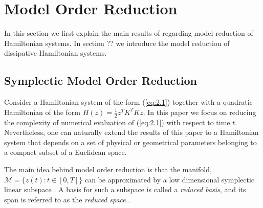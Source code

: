 \section{Model Order Reduction} \label{sec:3}
In this section we first explain the main results of \cite{Peng:2014di} regarding model reduction of Hamiltonian systems. In section ?? we introduce the model reduction of dissipative Hamiltonian systems.

\subsection{Symplectic Model Order Reduction}
Consider a Hamiltonian system of the form (\ref{eq:2.1}) together with a quadratic Hamiltonian of the form $H(z) = \frac 1 2 z^T K^T K z$. In this paper we focus on reducing the complexity of numerical evaluation of (\ref{eq:2.1}) with respect to time $t$. Nevertheless, one can naturally extend the results of this paper to a Hamiltonian system that depends on a set of physical or geometrical parameters belonging to a compact subset of a Euclidean space.

The main idea behind model order reduction is that the manifold, $\mathcal M = \{ z(t) : t \in [0,T] \}$ can be approximated by a low dimensional symplectic linear subspace \cite{hesthaven2015certified,quarteroni2015reduced}. A basis for such a subspace is called a \emph{reduced basis}, and its span is referred to as the \emph{reduced space} \cite{hesthaven2015certified}.

